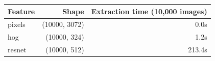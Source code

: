 \begin{tabular}{lrr}
\toprule
Feature & Shape & Extraction time (10{,}000 images) \\
\midrule
pixels & (10000, 3072) & 0.0s \\
hog & (10000, 324) & 1.2s \\
resnet & (10000, 512) & 213.4s \\
\bottomrule
\end{tabular}
